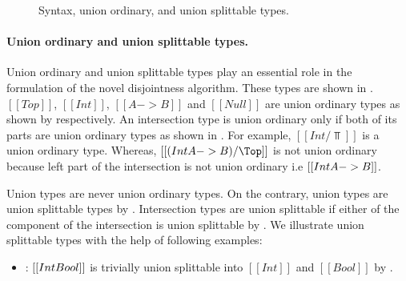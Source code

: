 
\begin{figure}[t]
  \begin{small}
    \centering
  \end{small}
  \caption{Syntax, union ordinary, and union splittable types.}
  \label{fig:disj:usp:uo}
\end{figure}


\paragraph{Union ordinary and union splittable types.}
Union ordinary and union splittable types \cite{}
play an essential role in the formulation of the
novel disjointness algorithm. These types are shown in .
$[[Top]]$, $[[Int]]$, $[[A -> B]]$ and $[[Null]]$ are union ordinary types as shown
by  respectively.
An intersection type is union ordinary only if both of its parts are union ordinary
types as shown in . For example, $[[Int/\Top]]$ is a union ordinary type.
Whereas, $[[(Int\/A->B)/\Top]]$ is not union ordinary because left part
of the intersection is not union ordinary i.e $[[Int\/A->B]]$.

Union types are never union ordinary types. On the contrary,
union types are union splittable types by . 
Intersection types are union splittable
if either of the component of the intersection is union splittable
by .
We illustrate union splittable types with the help of following examples:



\begin{itemize}
  \item {}: $[[Int\/Bool]]$ is trivially union
      splittable into $[[Int]]$ and $[[Bool]]$ by .
\end{itemize}

